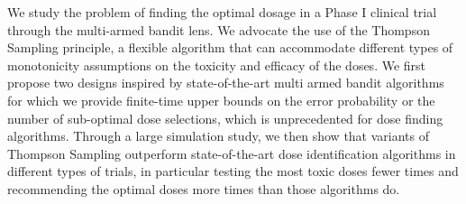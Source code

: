 



%
%

%
%
%
%
%

We study the problem of finding the optimal dosage in a Phase I clinical trial through the multi-armed bandit lens. We advocate the use of the Thompson Sampling principle, a flexible algorithm that can accommodate different types of monotonicity assumptions on the toxicity and efficacy of the doses. We first propose two designs inspired by state-of-the-art multi armed bandit algorithms for which we provide finite-time upper bounds on the error probability or the number of sub-optimal dose selections, which is unprecedented for dose finding algorithms. Through a large simulation study, we then show that variants of Thompson Sampling outperform state-of-the-art dose identification algorithms in different types of trials, in particular testing the most toxic doses fewer times and recommending the optimal doses more times than those algorithms do.

%
%

